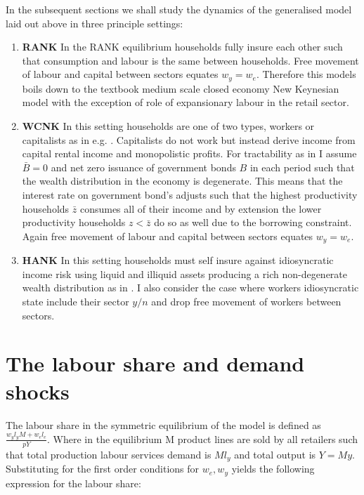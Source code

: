 \documentclass[12pt]{article}
\begin{document}
In the subsequent sections we shall study the dynamics of the generalised model laid out above in three principle settings:  

\begin{enumerate}
    \item \textbf{RANK} In the RANK equilibrium households fully insure each other such that consumption and labour is the same between households. Free movement of labour and capital between sectors equates $w_{y}=w_{e}$. Therefore this models boils down to the textbook medium scale closed economy New Keynesian model with the exception of role of expansionary labour in the retail sector. 
    \item \textbf{WCNK} In this setting households are one of two types, workers or capitalists as in e.g. \cite{broer2020new}. Capitalists do not work but instead derive income from capital rental income and monopolistic profits. For tractability as in \cite{ravn2021macroeconomic} I assume $\bar{B}=0$ and net zero issuance of government bonds $B$ in each period such that the wealth distribution in the economy is degenerate. This means that the interest rate on government bond's adjusts such that the highest productivity households $\bar{z}$ consumes all of their income and by extension the  lower productivity households $z<\bar{z}$ do so as well  due to the borrowing constraint. Again free movement of labour and capital between sectors equates $w_{y}=w_{e}$.    
    \item \textbf{HANK} In this setting households must self insure against idiosyncratic income risk using liquid and illiquid assets producing a rich non-degenerate wealth distribution as in \cite{bayer2020shocks}. I also consider the case where workers idiosyncratic state include their sector $y/n$ and drop free movement of workers between sectors.   
\end{enumerate}



\section{The labour share and demand shocks}

The labour share in the symmetric equilibrium of the model is defined as $\frac{w_{y}l_{y}M+w_{e}l_{e}}{pY}$. Where in the equilibrium M product lines are sold by all retailers such that total production labour services demand is $M l_{y}$ and total output is $Y=M y$. Substituting for the first order conditions for $w_e,w_y$ yields the following expression for the labour share:
\end{document}
